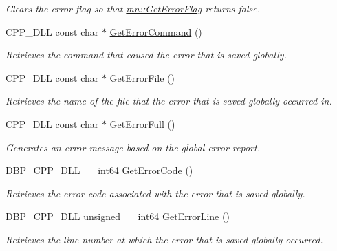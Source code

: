 \begin{DoxyCompactItemize}
\begin{DoxyCompactList}\small\item\em Clears the error flag so that \hyperlink{namespacemn_ac37658be31dcd70bd731e59f9731df4e}{mn::GetErrorFlag} returns false. \item\end{DoxyCompactList}\item 
CPP\_\-DLL const char $\ast$ \hyperlink{namespacemn_ad53407751aa123a13b1480610cbff41f}{GetErrorCommand} ()
\begin{DoxyCompactList}\small\item\em Retrieves the command that caused the error that is saved globally. \item\end{DoxyCompactList}\item 
CPP\_\-DLL const char $\ast$ \hyperlink{namespacemn_ae78660a00605a9b3839788c92e41bbcc}{GetErrorFile} ()
\begin{DoxyCompactList}\small\item\em Retrieves the name of the file that the error that is saved globally occurred in. \item\end{DoxyCompactList}\item 
CPP\_\-DLL const char $\ast$ \hyperlink{namespacemn_a4fbd35964159f82775dd96022c16cad7}{GetErrorFull} ()
\begin{DoxyCompactList}\small\item\em Generates an error message based on the global error report. \item\end{DoxyCompactList}\item 
DBP\_\-CPP\_\-DLL \_\-\_\-int64 \hyperlink{namespacemn_a2549f5831570f5109df5840719b407ae}{GetErrorCode} ()
\begin{DoxyCompactList}\small\item\em Retrieves the error code associated with the error that is saved globally. \item\end{DoxyCompactList}\item 
DBP\_\-CPP\_\-DLL unsigned \_\-\_\-int64 \hyperlink{namespacemn_a7ed53c036e816ff140be2084f6c7912e}{GetErrorLine} ()
\begin{DoxyCompactList}\small\item\em Retrieves the line number at which the error that is saved globally occurred. \item\end{DoxyCompactList}\item 

\end{DoxyCompactItemize}
